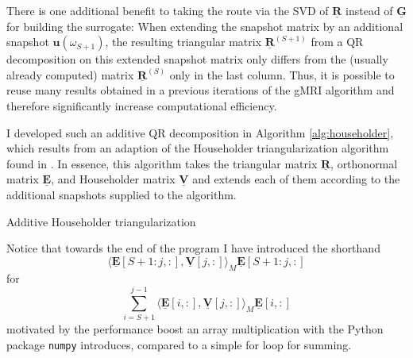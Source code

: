 \documentclass[11pt, a4paper]{article}
\begin{document}
There is one additional benefit to taking the route via the \acrshort{SVD} of
$\mathbf{\underline{R}}$ instead of $\mathbf{\underline{G}}$
for building the surrogate: When extending the snapshot matrix by an additional
snapshot $\mathbf{u}(\omega_{S+1})$, the resulting triangular matrix $\mathbf{\underline{R}}^{(S+1)}$
from a QR decomposition on this extended snapshot matrix only differs from the 
(usually already computed) matrix $\mathbf{\underline{R}}^{(S)}$ only in the last column.
Thus, it is possible to reuse many results obtained in a previous iterations of
the \acrshort{gMRI} algorithm and therefore significantly increase computational
efficiency.

I developed such an additive QR decomposition in Algorithm \ref{alg:householder},
which results from an adaption of the Householder triangularization algorithm
found in \citep{householder}. In essence, this algorithm takes the triangular
matrix $\mathbf{\underline{R}}$, orthonormal matrix $\mathbf{\underline{E}}$,
and Householder matrix $\mathbf{\underline{V}}$ and extends each of them according
to the additional snapshots supplied to the algorithm.

\begin{algorithm}
    \caption{Additive Householder triangularization} \label{alg:householder}
    
\end{algorithm}

Notice that towards the end of the program I have introduced the shorthand 
\begin{equation}
    \langle \mathbf{\underline{E}}[S+1:j, :], \mathbf{\underline{V}}[j, :] \rangle_M \mathbf{\underline{E}}[S+1:j, :]
\end{equation}
for 
\begin{equation}
    \sum_{i=S+1}^{j-1} \langle \mathbf{\underline{E}}[i, :], \mathbf{\underline{V}}[j, :] \rangle_M \mathbf{\underline{E}}[i, :]
\end{equation}
motivated by the performance boost an array multiplication with the Python package
\texttt{numpy} introduces, compared to a simple for loop for summing.
\end{document}
